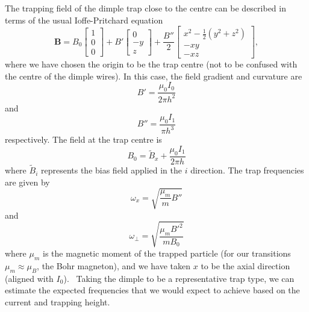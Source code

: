 The trapping field of the dimple trap close to the centre can be described in
terms of the usual Ioffe-Pritchard equation~\cite{Foot2005}
%
\begin{equation}
  \mathbf{B} = B_0 \begin{bmatrix} 1 \\ 0 \\0 \end{bmatrix}
               + B' \begin{bmatrix} 0 \\ -y \\ z \end{bmatrix}
               + \frac{B''}{2} \begin{bmatrix} 
                  x^2 - \frac{1}{2}(y^2 + z^2) \\
                  -xy \\
                  -xz
               \end{bmatrix},
\end{equation}
%
where we have chosen the origin to be the trap centre (not to be confused with
the centre of the dimple wires). In this case, the field gradient and curvature
are
%
\begin{equation}
  B' = \frac{\mu_0 I_0}{2\pi h^2}
\end{equation}
%
and
%
\begin{equation}
  B'' = \frac{\mu_0 I_1}{\pi h^3}
\end{equation}
%
respectively. The field at the trap centre is
%
\begin{equation}
  B_0 = \widetilde{B}_x + \frac{\mu_0 I_1}{2\pi h}
  \label{litrev:eqn:bias}
\end{equation}
%
where $\widetilde{B}_i$ represents the bias field applied in the $i$ direction.
The trap frequencies are given by
\begin{equation}
  \omega_x = \sqrt{\frac{\mu_m}{m}B''}
  \label{litrev:eqn:axisfreq}
\end{equation}
and
\begin{equation}
  \omega_\perp = \sqrt{\frac{\mu_m {B'}^2}{m B_0}}
  \label{litrev:eqn:transfreq}
\end{equation}
where $\mu_m$ is the magnetic moment of the trapped particle (for our \CaF{}
transitions $\mu_m \approx \mu_B$, the Bohr magneton), and we have taken $x$ to
be the axial direction (aligned with $I_0$).~\cite{2011Ac} Taking the dimple to
be a representative trap type, we can estimate the expected frequencies that we
would expect to achieve based on the current and trapping height.

